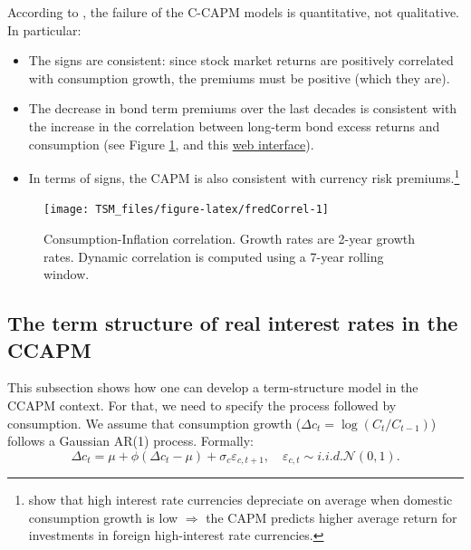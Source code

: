 \documentclass[
  12pt,
]{book}
\providecommand{\tightlist}{%
  \setlength{\itemsep}{0pt}\setlength{\parskip}{0pt}}
\theoremstyle{definition}
\theoremstyle{definition}
\theoremstyle{definition}
\theoremstyle{definition}
\theoremstyle{remark}
\begin{document}
According to \citet{Cochrane_2005}, the failure of the C-CAPM models is quantitative, not qualitative. In particular:

\begin{itemize}
\tightlist
\item
  The signs are consistent: since stock market returns are positively correlated with consumption growth, the premiums must be positive (which they are).
\item
  The decrease in bond term premiums over the last decades is consistent with the increase in the correlation between long-term bond excess returns and consumption (see Figure \ref{fig:fredCorrel}, and this \href{https://jrenne.shinyapps.io/APModels}{web interface}).
\item
  In terms of signs, the CAPM is also consistent with currency risk premiums.\footnote{\citet{Lustig_Verdelhan_2007} show that high interest rate currencies depreciate on average when domestic consumption growth is low \(\Rightarrow\) the CAPM predicts higher average return for investments in foreign high-interest rate currencies.}
\end{itemize}

\begin{figure}
\texttt{[image: TSM\_files/figure-latex/fredCorrel-1]} \caption{Consumption-Inflation correlation. Growth rates are 2-year growth rates. Dynamic correlation is computed using a 7-year rolling window.}\label{fig:fredCorrel}
\end{figure}

\hypertarget{TSCCAPM}{%
\subsection{The term structure of real interest rates in the CCAPM}\label{TSCCAPM}}

This subsection shows how one can develop a term-structure model in the CCAPM context. For that, we need to specify the process followed by consumption. We assume that consumption growth (\(\Delta c_{t}=\log (C_{t}/C_{t-1})\)) follows a Gaussian AR(1) process. Formally:
\[
\Delta c_{t} = \mu + \phi (\Delta c_t - \mu) + \sigma_c \varepsilon_{c,t+1},\quad \varepsilon_{c,t} \sim i.i.d.\mathcal{N}(0,1).
\]
\end{document}
